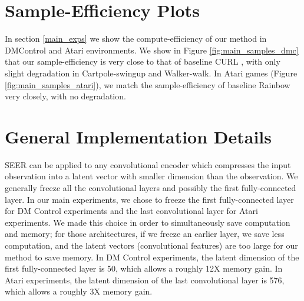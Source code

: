 \documentclass{article}
\begin{document}
\section{Sample-Efficiency Plots} \label{appendix:additional_figures2}
In section \ref{main_exps} we show the compute-efficiency of our method in DMControl and Atari environments. We show in Figure \ref{fig:main_samples_dmc} that our sample-efficiency is very close to that of baseline CURL \citep{srinivas2020curl}, with only slight degradation in Cartpole-swingup and Walker-walk. In Atari games (Figure \ref{fig:main_samples_atari}), we match the sample-efficiency of baseline Rainbow \citep{hessel2018rainbow} very closely, with no degradation.

\section{General Implementation Details} \label{appendix:freezing_details}
SEER can be applied to any convolutional encoder which compresses the input observation into a latent vector with smaller dimension than the observation. We generally freeze all the convolutional layers and possibly the first fully-connected layer. In our main experiments, we chose to freeze the first fully-connected layer for DM Control experiments and the last convolutional layer for Atari experiments. We made this choice in order to simultaneously save computation and memory; for those architectures, if we freeze an earlier layer, we save less computation, and the latent vectors (convolutional features) are too large for our method to save memory. In DM Control experiments, the latent dimension of the first fully-connected layer is 50, which allows a roughly 12X memory gain. In Atari experiments, the latent dimension of the last convolutional layer is 576, which allows a roughly 3X memory gain.

\begin{figure*} [t] \centering
{} 
\\
\caption{Comparison of the sample-efficiency of CURL with and without SEER, corresponding to Figure \ref{fig:main_dmc}. The dotted gray line denotes the encoder freezing time $t=T_f$. The solid line and shaded regions represent the mean and standard deviation, respectively, across five runs.} \label{fig:main_samples_dmc}
\end{figure*}
\end{document}
